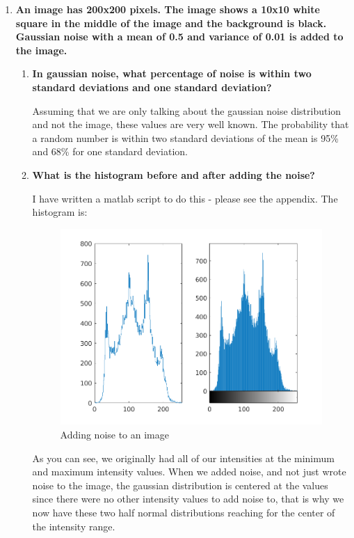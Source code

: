 \begin{enumerate}[font=\bfseries]

    \item \textbf{An image has 200x200 pixels. The image shows a 10x10 white
    square in the middle of the image and the background is black. Gaussian
    noise with a mean of 0.5 and variance of 0.01 is added to the image.}

    \begin{enumerate}[font=\bfseries, label=\alph*.]
	
	\item \textbf{In gaussian noise, what percentage of noise is within two
	standard deviations and one standard deviation?}

	Assuming that we are only talking about the gaussian noise distribution
	and not the image, these values are very well known. The probability
	that a random number is within two standard deviations of the mean is
	95\% and 68\% for one standard deviation.

	\item \textbf{What is the histogram before and after adding the noise?}

	I have written a matlab script to do this - please see the appendix. The
	histogram is:

	\begin{figure}[H]
	    \centering
	    \includegraphics{addnoise.png}
	    \caption{Adding noise to an image}
	\end{figure}

	As you can see, we originally had all of our intensities at the minimum
	and maximum intensity values. When we added noise, and not just wrote
	noise to the image, the gaussian distribution is centered at the values
	since there were no other intensity values to add noise to, that is why
	we now have these two half normal distributions reaching for the center
	of the intensity range.
    

\end{enumerate}
\end{enumerate}
